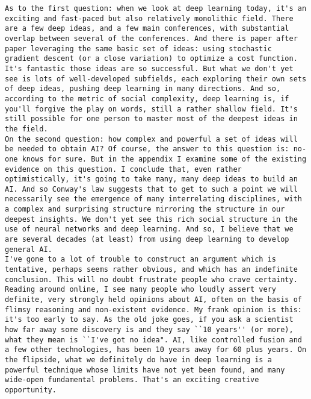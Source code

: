 \begin{lstlisting}
As to the first question: when we look at deep learning today, it's an exciting and fast-paced but also relatively monolithic field. There are a few deep ideas, and a few main conferences, with substantial overlap between several of the conferences. And there is paper after paper leveraging the same basic set of ideas: using stochastic gradient descent (or a close variation) to optimize a cost function. It's fantastic those ideas are so successful. But what we don't yet see is lots of well-developed subfields, each exploring their own sets of deep ideas, pushing deep learning in many directions. And so, according to the metric of social complexity, deep learning is, if you'll forgive the play on words, still a rather shallow field. It's still possible for one person to master most of the deepest ideas in the field.
On the second question: how complex and powerful a set of ideas will be needed to obtain AI? Of course, the answer to this question is: no-one knows for sure. But in the appendix I examine some of the existing evidence on this question. I conclude that, even rather optimistically, it's going to take many, many deep ideas to build an AI. And so Conway's law suggests that to get to such a point we will necessarily see the emergence of many interrelating disciplines, with a complex and surprising structure mirroring the structure in our deepest insights. We don't yet see this rich social structure in the use of neural networks and deep learning. And so, I believe that we are several decades (at least) from using deep learning to develop general AI.
I've gone to a lot of trouble to construct an argument which is tentative, perhaps seems rather obvious, and which has an indefinite conclusion. This will no doubt frustrate people who crave certainty. Reading around online, I see many people who loudly assert very definite, very strongly held opinions about AI, often on the basis of flimsy reasoning and non-existent evidence. My frank opinion is this: it's too early to say. As the old joke goes, if you ask a scientist how far away some discovery is and they say ``10 years'' (or more), what they mean is ``I've got no idea". AI, like controlled fusion and a few other technologies, has been 10 years away for 60 plus years. On the flipside, what we definitely do have in deep learning is a powerful technique whose limits have not yet been found, and many wide-open fundamental problems. That's an exciting creative opportunity.


\end{lstlisting}
